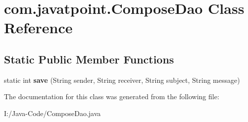 \hypertarget{classcom_1_1javatpoint_1_1_compose_dao}{}\section{com.\+javatpoint.\+Compose\+Dao Class Reference}
\label{classcom_1_1javatpoint_1_1_compose_dao}
\subsection*{Static Public Member Functions}
\begin{DoxyCompactItemize}
\item 
\mbox{\label{classcom_1_1javatpoint_1_1_compose_dao_a041467a64b96bde8fa9e0c4aed883443}} 
static int {\bfseries save} (String sender, String receiver, String subject, String message)
\end{DoxyCompactItemize}


The documentation for this class was generated from the following file\+:\begin{DoxyCompactItemize}
\item 
I\+:/\+Java-\/\+Code/Compose\+Dao.\+java\end{DoxyCompactItemize}
